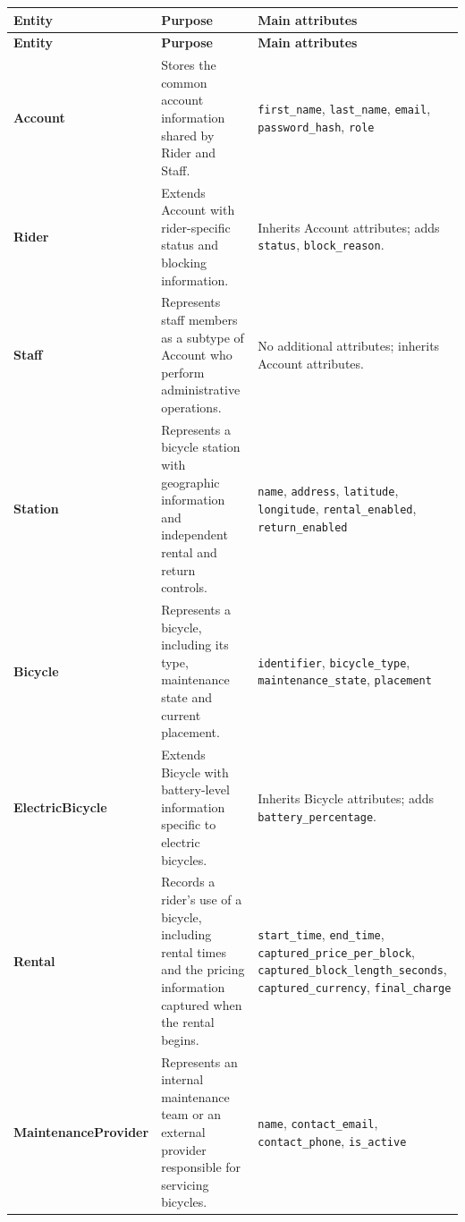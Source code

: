 \documentclass[10pt,a4paper,landscape]{article}
\begin{document}
\begin{longtable}{|L{35mm}|L{75mm}|L{146mm}|}
\hline
\textbf{Entity} & \textbf{Purpose} & \textbf{Main attributes}\\
\hline
\endfirsthead

\hline
\textbf{Entity} & \textbf{Purpose} & \textbf{Main attributes}\\
\hline
\endhead

\textbf{Account} &
Stores the common account information shared by Rider and Staff. &
\texttt{first\_name}, \texttt{last\_name}, \texttt{email}, \texttt{password\_hash}, \texttt{role}\\
\hline

\textbf{Rider} &
Extends Account with rider-specific status and blocking information. &
Inherits Account attributes; adds \texttt{status}, \texttt{block\_reason}.\\
\hline

\textbf{Staff} &
Represents staff members as a subtype of Account who perform administrative operations. &
No additional attributes; inherits Account attributes.\\
\hline

\textbf{Station} &
Represents a bicycle station with geographic information and independent rental and return controls. &
\texttt{name}, \texttt{address}, \texttt{latitude}, \texttt{longitude}, \texttt{rental\_enabled}, \texttt{return\_enabled}\\
\hline

\textbf{Bicycle} &
Represents a bicycle, including its type, maintenance state and current placement. &
\texttt{identifier}, \texttt{bicycle\_type}, \texttt{maintenance\_state}, \texttt{placement}\\
\hline

\textbf{ElectricBicycle} &
Extends Bicycle with battery-level information specific to electric bicycles. &
Inherits Bicycle attributes; adds \texttt{battery\_percentage}.\\
\hline

\textbf{Rental} &
Records a rider's use of a bicycle, including rental times and the pricing information captured when the rental begins. &
\texttt{start\_time}, \texttt{end\_time}, \texttt{captured\_price\_per\_block}, \texttt{captured\_block\_length\_seconds}, \texttt{captured\_currency}, \texttt{final\_charge}\\
\hline

\textbf{MaintenanceProvider} &
Represents an internal maintenance team or an external provider responsible for servicing bicycles. &
\texttt{name}, \texttt{contact\_email}, \texttt{contact\_phone}, \texttt{is\_active}\\
\hline


\end{longtable}
\end{document}
